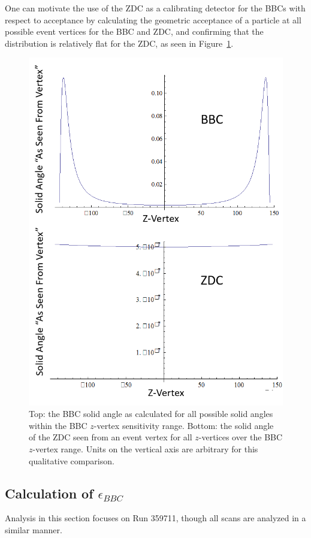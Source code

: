 One can motivate the use of the ZDC as a calibrating detector for the BBCs with
respect to acceptance by calculating the geometric acceptance of a particle at
all possible event vertices for the BBC and ZDC, and confirming that the
distribution is relatively flat for the ZDC, as seen in
Figure~\ref{fig:solid_angle_compare}.

\begin{figure}
  \centering
  \includegraphics[width=0.8\linewidth]{./figures/solid_angle_compare.png}
  \caption{
    Top: the BBC solid angle as calculated for all possible solid angles within
    the BBC $z$-vertex sensitivity range. Bottom: the solid angle of the ZDC
    seen from an event vertex for all $z$-vertices over the BBC $z$-vertex
    range. Units on the vertical axis are arbitrary for this qualitative
    comparison.
  }
  \label{fig:solid_angle_compare}
\end{figure}

\clearpage
\subsection{Calculation of $\epsilon_{BBC}$}

Analysis in this section focuses on Run 359711, though all scans are analyzed in
a similar manner.

